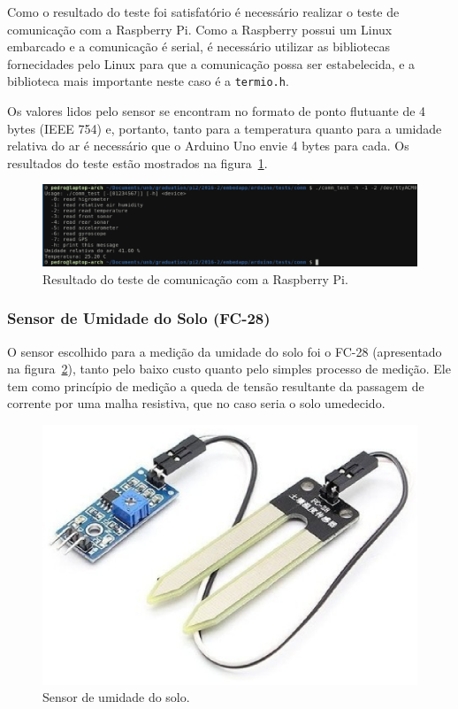 		Como o resultado do teste foi satisfatório é necessário realizar
		o teste de comunicação com a Raspberry Pi. Como a Raspberry possui
		um Linux embarcado e a comunicação é serial, é necessário utilizar
		as bibliotecas fornecidades pelo Linux para que a comunicação
		possa ser estabelecida, e a biblioteca mais importante neste caso
		é a \texttt{termio.h}.
		
		Os valores lidos pelo sensor se encontram no formato de ponto flutuante
		de 4 bytes (IEEE 754) e, portanto, tanto para a temperatura quanto
		para a umidade relativa do ar é necessário que o Arduino Uno envie
		4 bytes para cada. Os resultados do teste estão mostrados na figura~\ref{fig:am2302rasp}.

		\begin{figure}[!htbp]
		\begin{center}
		\includegraphics[width=\textwidth]{figuras/am2302_raspberry.eps}
		\caption{\label{fig:am2302rasp}Resultado do teste de comunicação com a Raspberry Pi.}
		\end{center}
		\end{figure}

	\subsubsection{Sensor de Umidade do Solo (FC-28)}

		O sensor escolhido para a medição da umidade do solo foi o FC-28 (apresentado
		na figura~\ref{fig:fc28}),
		tanto pelo baixo custo quanto pelo simples processo de medição.
		Ele tem como princípio de medição a queda de tensão resultante da
		passagem de corrente por uma malha resistiva, que no caso seria o solo
		umedecido.

		\begin{figure}[!htbp]
		\begin{center}
		\includegraphics[width=.5\textwidth]{figuras/higrometer.eps}
		\caption{\label{fig:fc28}Sensor de umidade do solo.}
		\end{center}
		\end{figure}


